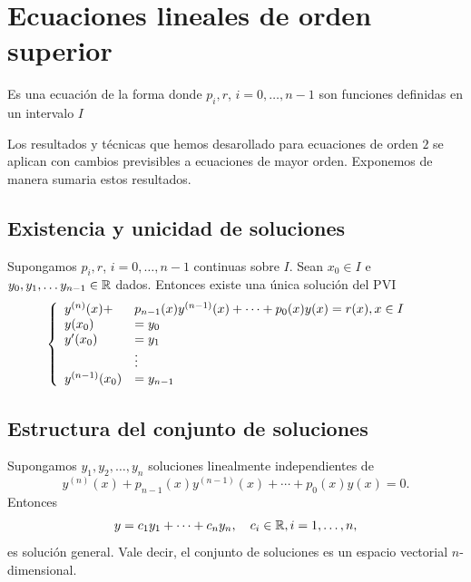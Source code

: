 \section{Ecuaciones lineales de orden superior}


\begin{definicion}
Es una ecuación de la forma
donde $p_i,r$, $i=0,\ldots,n-1$ son funciones definidas en un intervalo $I$
\end{definicion}


Los resultados y técnicas que hemos desarollado para ecuaciones de orden $2$ se aplican con cambios previsibles a ecuaciones de mayor orden. Exponemos de manera sumaria
estos resultados.

\subsection{Existencia y unicidad de soluciones}

\begin{teorema}
 Supongamos $p_i,r$, $i=0,\ldots,n-1$ continuas sobre $I$. Sean $x_0\in I$ e $y_0,y_1,\ldots y_{n-1}\in\mathbb{R}$ dados. Entonces existe una única solución del PVI
 \[\left\{
 \begin{array}{l l l}
   y^{(n)}(x)+&p_{n-1}(x)y^{(n-1)}(x)+\cdots+p_0(x)y(x)=r(x),x\in I\\
   y(x_0)&=y_0&\\
   y'(x_0)&=y_1&\\
   &\vdots\\
  y^{(n-1)}(x_0)&=y_{n-1}&\\
  \end{array}\right.
\]

\end{teorema}


\subsection{Estructura del conjunto de soluciones}

\begin{teorema}
Supongamos $y_1,y_2,\ldots,y_n$ soluciones linealmente independientes de
\[y^{(n)}(x)+p_{n-1}(x)y^{(n-1)}(x)+\cdots+p_0(x)y(x)=0.\]
Entonces
\[y=c_1y_1+\cdots+c_ny_n,\quad c_i\in\mathbb{R}, i=1,\ldots,n,\]
es solución general. Vale decir, el conjunto de soluciones es un espacio vectorial $n$-dimensional.
\end{teorema}



